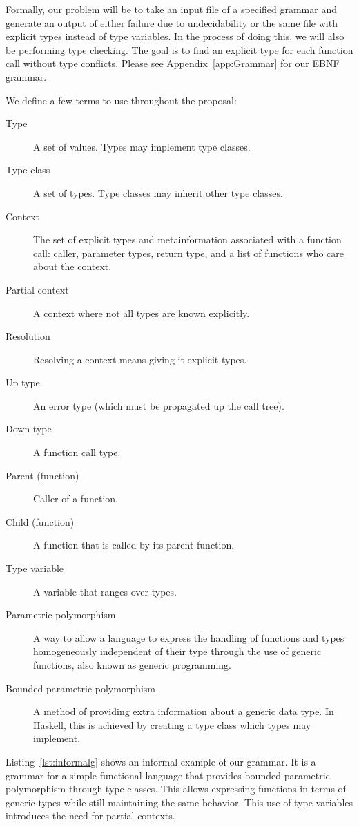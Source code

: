 \documentclass{acm_proc_article-sp}
\begin{document}
Formally, our problem will be to take an input file of a specified grammar and
generate an output of either failure due to undecidability or the same file
with explicit types instead of type variables. In the process of doing this, we
will also be performing type checking. The goal is to find an explicit type for
each function call without type conflicts. Please see Appendix~\ref{app:Grammar}
for our EBNF grammar.

We define a few terms to use throughout the proposal:
\begin{description}
	\item[Type] A set of values. Types may implement type classes.
	\item[Type class] A set of types. Type classes may inherit other type classes.
	\item[Context] The set of explicit types and metainformation associated
		with a function call: caller, parameter types, return type,
		and a list of functions who care about the context.
	\item[Partial context] A context where not all types are known explicitly.
	\item[Resolution] Resolving a context means giving it explicit types.
	\item[Up type] An error type (which must be propagated up the call tree).
	\item[Down type] A function call type.
	\item[Parent (function)] Caller of a function.
	\item[Child (function)] A function that is called by its parent function.
	\item[Type variable] A variable that ranges over types.
	\item[Parametric polymorphism] A way to allow a language to express the
		handling of functions and types homogeneously independent of their type
		through the use of generic functions, also known as generic
		programming.
	\item[Bounded parametric polymorphism] A method of providing extra
		information about a generic data type. In Haskell, this is achieved by
		creating a type class which types may implement.
\end{description}

Listing~\ref{lst:informalg} shows an informal example of our grammar. It is a
grammar for a simple functional language that provides bounded parametric
polymorphism through type classes. This allows expressing functions in terms of
generic types while still maintaining the same behavior. This use of type
variables introduces the need for partial contexts.
\end{document}
